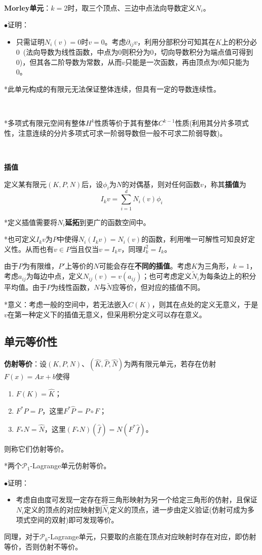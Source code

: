 \documentclass[a4paper,UTF8,fontset=windows]{ctexart}
\newcommand*{\cp}{\mathcal{P}}
\newcommand{\proo}[1]{{\kaishu $\bullet$证明：
\begin{itemize}
    \item[] #1
\end{itemize}
}}
\begin{document}
\

\textbf{Morley单元}：$k=2$时，取三个顶点、三边中点法向导数定义$N_i$。

\proo{
    只需证明$N_i(v)=0$时$v=0$。考虑$\partial_{ij}v$，利用分部积分可知其在$K$上的积分必0\ (法向导数为线性函数，中点为0则积分为0，切向导数积分为端点值可得到0)，但其各二阶导数为常数，从而$v$只能是一次函数，再由顶点为0知只能为0。
}

*此单元构成的有限元无法保证整体连续，但具有一定的导数连续性。

\

*多项式有限元空间有整体$H^k$性质等价于其有整体$C^{k-1}$性质(利用其分片多项式性，注意连续的分片多项式可求一阶弱导数但一般不可求二阶弱导数)。

\

\textbf{插值}

定义某有限元$(K,P,N)$后，设$\phi_i$为$N$的对偶基，则对任何函数$v$，称其\textbf{插值}为
$$I_kv=\sum_{i=1}^dN_i(v)\phi_i$$

*定义插值需要将$N_i$\textbf{延拓}到更广的函数空间中。

*也可定义$I_kv$为$P$中使得$N_i(I_kv)=N_i(v)$的函数，利用唯一可解性可知良好定义性。从而也有$v\in P$当且仅当$v=I_kv$，同理$I_k^2=I_k$。

由于$P$为有限维，$P'$上等价的$N$可能会存在\textbf{不同的插值}。考虑$K$为三角形，$k=1$，考虑$a_{ij}$为每边中点，定义$N_{ij}(v)=v(a_{ij})$；也可考虑定义$\tilde{N}_i$为每条边上的积分平均值。由于$P$为线性函数，$N$与$\tilde{N}$应等价，但对应的插值不同。

*意义：考虑一般的空间中，若无法嵌入$C(K)$，则其在点处的定义无意义，于是$v$在第一种定义下的插值无意义，但采用积分定义可以存在意义。

\subsection{单元等价性}
\textbf{仿射等价}：设$(K,P,N)$、$(\hat{K},\hat{P},\hat{N})$为两有限元单元，若存在仿射$F(x)=Ax+b$使得
\begin{enumerate}
    \item $F(K)=\hat{K}$；
    \item $F^*\hat{P}=P$，这里$F^*\hat{P}=P\circ F$；
    \item $F_*N=\hat{N}$，这里$(F_*N)(\hat{f})=N(F^*\hat{f})$。
\end{enumerate}
则称它们仿射等价。

*两个$\cp_1$-Lagrange单元仿射等价。

\proo{
    考虑自由度可发现一定存在将三角形映射为另一个给定三角形的仿射，且保证$N_i$定义的顶点的对应映射到$\hat{N}_i$定义的顶点，进一步由定义验证(仿射可成为多项式空间的双射)即可发现等价。
}
同理，对于$\cp_k$-Lagrange单元，只要取的点能在顶点对应映射时存在对应，即仿射等价，否则仿射不等价。
\end{document}
